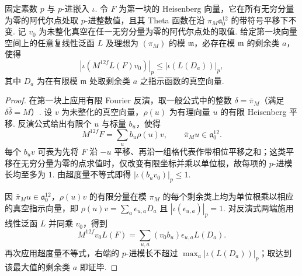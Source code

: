 \begin{lemma}
\label{lem:c-derivative-fourier-indicator}
\emitthmsource
固定素数 $p$ 与 $p$-进嵌入 $\iota$. 令 $F$ 为第一块的 Heisenberg 向量，它在所有无穷分量为零的阿代尔点处取 $p$-进整数值，且其 Theta 函数在沿 $\pi_M\mathfrak a_0^{12}$ 的带符号平移下不变. 记 $v_0$ 为未整化真空在任一无穷分量为零的阿代尔点处的取值. 给定第一块向量空间上的任意复线性泛函 $L$ 及理想为 $(\pi_M)$ 的模 $\mathfrak m$，必存在模 $\mathfrak m$ 的剩余类 $a$，使得
\[
  |\iota(M^{12f}L(F)v_0)|_p\le|\iota(L(D_a))|_p ,
\]
其中 $D_a$ 为在有限模 $\mathfrak m$ 处取剩余类 $a$ 之指示函数的真空向量.
\end{lemma}

\begin{proof}
在第一块上应用有限 Fourier 反演，取一般公式中的整数 $\delta=\bar\pi_M$（满足 $\delta\bar\delta=M$）. 设 $v$ 为未整化的真空向量，$\rho(u)$ 为有理向量 $u$ 的有限 Heisenberg 平移. 反演公式给出有限个 $u$ 与标量 $b_u$，使得
\[
 M^{12f}F=\sum_u b_u\rho(u)v,\qquad
 \bar\pi_M u\in\mathfrak a_0^{12}.
\]
每个 $b_u v$ 可表为先将 $F$ 沿 $-u$ 平移、再沿一组格代表作带相位平移之和；这类平移在无穷分量为零的点求值时，仅改变有限坐标并乘以单位根，故每项的 $p$-进模长均至多为 $1$. 由超度量不等式即得 $|\iota(b_u v_0)|_p\le1$.

因 $\bar\pi_M u\in\mathfrak a_0^{12}$，$\rho(u)v$ 的有限分量在模 $\pi_M$ 的每个剩余类上均为单位根乘以相应的真空指示向量，即 $\rho(u)v=\sum_a\epsilon_{u,a}D_a$ 且 $|\iota(\epsilon_{u,a})|_p=1$. 对反演式两端施用线性泛函 $L$ 并同乘 $v_0$，得到
\[
 M^{12f}v_0 L(F)
      =\sum_{u,a}(v_0 b_u)\epsilon_{u,a}L(D_a).
\]
再次应用超度量不等式，右端的 $p$-进模长不超过 $\max_a|\iota(L(D_a))|_p$；取达到该最大值的剩余类 $a$ 即证毕.
\end{proof}

